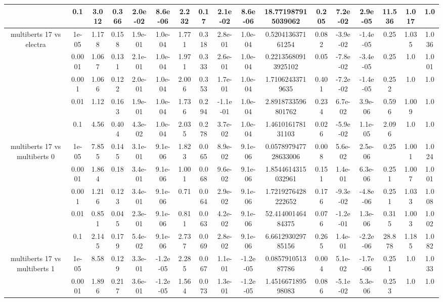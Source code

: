 \begin{tabular}{|c|c|c|c|c|c|c|c|c|c|c|c|c|c|c|c|c|}
 & 0.1 & 3.012 & 0.366 & 2.0e-02 & 8.6e-06 & 2.232 & 0.17 & 2.1e-02 & 8.6e-06 & 18.771987915039062 & 0.205 & 7.2e-02 & 2.9e-05 & 11.536 & 1.017 & 1.0 \\
\hline
\multirow{5}{*}{multiberts 17 vs electra } & 1e-05 & 1.178 & 0.158 & 1.9e-01 & 1.0e-04 & 1.771 & 0.318 & 2.8e-01 & 1.0e-04 & 0.520413637161254 & 0.082 & -3.9e-02 & -1.4e-05 & 0.25 & 1.035 & 1.036 \\
 & 0.0001 & 1.067 & 0.131 & 2.1e-01 & 1.0e-04 & 1.971 & 0.333 & 2.6e-01 & 1.0e-04 & 0.22135680913925102 & 0.05 & -7.8e-02 & -3.4e-05 & 0.25 & 1.0 & 1.001 \\
 & 0.001 & 1.066 & 0.122 & 2.0e-01 & 1.0e-04 & 2.006 & 0.353 & 1.7e-01 & 1.0e-04 & 1.71062433719635 & 0.401 & -7.2e-02 & -1.4e-05 & 0.252 & 1.0 & 1.0 \\
 & 0.01 & 1.12 & 0.163 & 1.9e-01 & 1.0e-04 & 1.736 & 0.294 & -1.1e-01 & 1.0e-04 & 2.8918733596801762 & 0.234 & 6.7e-02 & 3.9e-06 & 0.596 & 1.009 & 1.0 \\
 & 0.1 & 4.56 & 0.404 & 4.3e-02 & 1.0e-04 & 2.035 & 0.278 & 3.7e-02 & 1.0e-04 & 1.461016178131103 & 0.026 & -5.9e-02 & 1.1e-05 & 2.096 & 1.0 & 1.0 \\
\hline
\multirow{5}{*}{multiberts 17 vs multiberts 0} & 1e-05 & 7.855 & 0.145 & 3.1e-01 & 9.1e-06 & 1.823 & 0.065 & 8.9e-02 & 9.1e-06 & 0.057897947728633006 & 0.008 & 5.6e-02 & 2.5e-06 & 0.25 & 1.001 & 1.024 \\
 & 0.0001 & 1.864 & 0.18 & 3.4e-01 & 9.1e-06 & 1.001 & 0.068 & 9.6e-02 & 9.1e-06 & 1.8544614315032961 & 0.151 & 1.4e-01 & 6.3e-06 & 0.251 & 1.007 & 1.001 \\
 & 0.001 & 1.216 & 0.123 & 3.4e-01 & 9.1e-06 & 0.71 & 0.064 & 2.9e-02 & 9.1e-06 & 1.7219276428222652 & 0.176 & -9.3e-02 & -4.8e-06 & 0.251 & 1.033 & 1.008 \\
 & 0.01 & 0.851 & 0.045 & 2.3e-01 & 9.1e-06 & 0.811 & 0.063 & 4.2e-02 & 9.1e-06 & 52.41400146484375 & 0.076 & -1.2e-01 & 1.3e-06 & 0.315 & 1.003 & 1.002 \\
 & 0.1 & 2.145 & 0.179 & 5.4e-02 & 9.1e-06 & 2.737 & 0.069 & 2.8e-02 & 9.1e-06 & 6.661293029785156 & 0.265 & 1.4e-01 & -2.2e-06 & 28.878 & 1.185 & 1.082 \\
\hline
\multirow{5}{*}{multiberts 17 vs multiberts 1} & 1e-05 & 8.58 & 0.129 & 3.3e-01 & -1.2e-05 & 2.285 & 0.067 & 1.1e-01 & -1.2e-05 & 0.085791051387786 & 0.004 & 5.1e-02 & -1.7e-06 & 0.251 & 1.0 & 1.033 \\
 & 0.0001 & 1.896 & 0.217 & 3.6e-01 & -1.2e-05 & 1.564 & 0.073 & 1.3e-01 & -1.2e-05 & 1.451667189598083 & 0.086 & -5.1e-02 & 5.3e-06 & 0.253 & 1.0 & 1.0 \\

\end{tabular}
